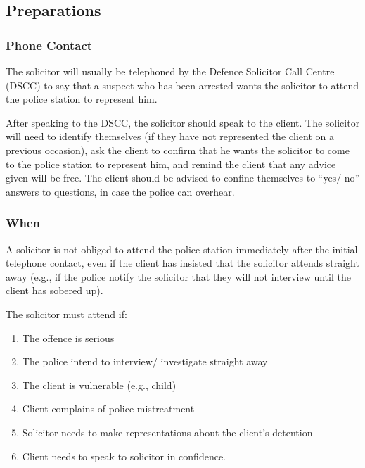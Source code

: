 \documentclass[
]{article}
\providecommand{\tightlist}{%
  \setlength{\itemsep}{0pt}\setlength{\parskip}{0pt}}
\begin{document}
\hypertarget{preparations}{%
\subsection{Preparations}\label{preparations}}

\hypertarget{phone-contact}{%
\subsubsection{Phone Contact}\label{phone-contact}}

The solicitor will usually be telephoned by the Defence Solicitor Call
Centre (DSCC) to say that a suspect who has been arrested wants the
solicitor to attend the police station to represent him.

After speaking to the DSCC, the solicitor should speak to the client.
The solicitor will need to identify themselves (if they have not
represented the client on a previous occasion), ask the client to
confirm that he wants the solicitor to come to the police station to
represent him, and remind the client that any advice given will be free.
The client should be advised to confine themselves to ``yes/ no''
answers to questions, in case the police can overhear.

\hypertarget{when}{%
\subsubsection{When}\label{when}}

A solicitor is not obliged to attend the police station immediately
after the initial telephone contact, even if the client has insisted
that the solicitor attends straight away (e.g., if the police notify the
solicitor that they will not interview until the client has sobered up).

The solicitor must attend if:

\begin{enumerate}
\def\labelenumi{\arabic{enumi}.}
\tightlist
\item
  The offence is serious
\item
  The police intend to interview/ investigate straight away
\item
  The client is vulnerable (e.g., child)
\item
  Client complains of police mistreatment
\item
  Solicitor needs to make representations about the client's detention
\item
  Client needs to speak to solicitor in confidence.
\end{enumerate}
\end{document}
